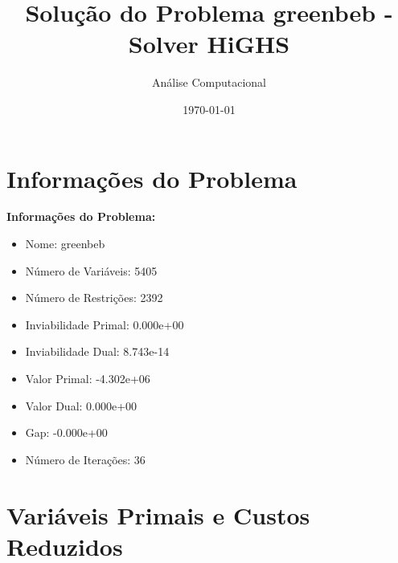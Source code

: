 \documentclass[12pt]{article}
\title{Solução do Problema greenbeb - Solver HiGHS}
\author{Análise Computacional}
\date{\today}
\begin{document}
\maketitle

\section{Informações do Problema}

\textbf{Informações do Problema:}
\begin{itemize}
\item Nome: greenbeb
\item Número de Variáveis: 5405
\item Número de Restrições: 2392
\item Inviabilidade Primal: 0.000e+00
\item Inviabilidade Dual: 8.743e-14
\item Valor Primal: -4.302e+06
\item Valor Dual: 0.000e+00
\item Gap: -0.000e+00
\item Número de Iterações: 36
\end{itemize}


\section{Variáveis Primais e Custos Reduzidos}
\end{document}
